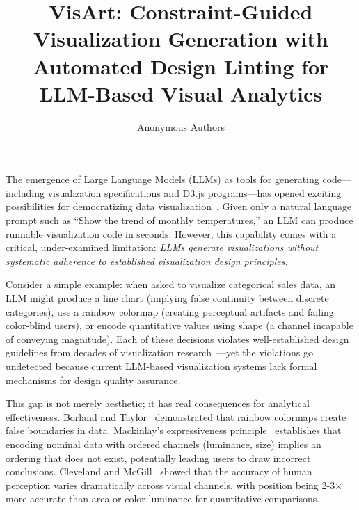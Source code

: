 \documentclass[journal]{vgtc}
\title{VisArt: Constraint-Guided Visualization Generation with\\ Automated Design Linting for LLM-Based Visual Analytics}
\author{
  Anonymous Authors
}
\begin{document}

\maketitle

The emergence of Large Language Models (LLMs) as tools for generating code—including visualization specifications and D3.js programs—has opened exciting possibilities for democratizing data visualization~\cite{dibia2023lida,li2024lightva}.
Given only a natural language prompt such as ``Show the trend of monthly temperatures,'' an LLM can produce runnable visualization code in seconds.
However, this capability comes with a critical, under-examined limitation: \textit{LLMs generate visualizations without systematic adherence to established visualization design principles.}

Consider a simple example: when asked to visualize categorical sales data, an LLM might produce a line chart (implying false continuity between discrete categories), use a rainbow colormap (creating perceptual artifacts and failing color-blind users), or encode quantitative values using shape (a channel incapable of conveying magnitude).
Each of these decisions violates well-established design guidelines from decades of visualization research~\cite{cleveland1984graphical,mackinlay1986automating,munzner2014visualization}—yet the violations go undetected because current LLM-based visualization systems lack formal mechanisms for design quality assurance.

This gap is not merely aesthetic; it has real consequences for analytical effectiveness.
Borland and Taylor~\cite{borland2007rainbow} demonstrated that rainbow colormaps create false boundaries in data.
Mackinlay's expressiveness principle~\cite{mackinlay1986automating} establishes that encoding nominal data with ordered channels (luminance, size) implies an ordering that does not exist, potentially leading users to draw incorrect conclusions.
Cleveland and McGill~\cite{cleveland1984graphical} showed that the accuracy of human perception varies dramatically across visual channels, with position being 2-3$\times$ more accurate than area or color luminance for quantitative comparisons.
\end{document}
